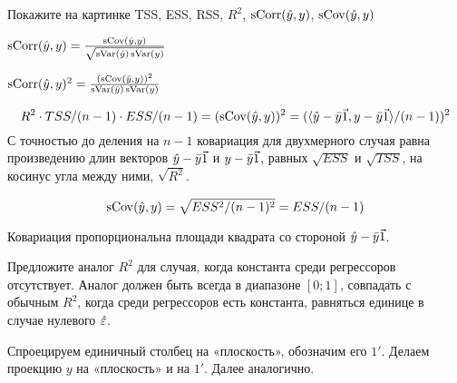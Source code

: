 \begin{problem}
Покажите на картинке TSS, ESS, RSS, $R^2$, $\operatorname{sCorr}(\hat{y}, y)$, $\operatorname{sCov}(\hat{y}, y)$





\begin{sol}
$\operatorname{sCorr}(\hat{y}, y)=\frac{\operatorname{sCov}(\hat{y}, y)}{\sqrt{\operatorname{sVar}(\hat{y})\operatorname{sVar}(y)}}$

$\operatorname{sCorr}(\hat{y}, y)^2=\frac{(\operatorname{sCov}(\hat{y}, y))^2}{\operatorname{sVar}(\hat{y})\operatorname{sVar}(y)}$

\[
R^2\cdot TSS/(n-1)\cdot ESS/(n-1)=(\sCov(\hy, y))^2=(\langle \hy-\bar y\v1, y-\bar y\v1 \rangle/(n-1))^2
\]
С точностью до деления на $n-1$ ковариация для двухмерного случая равна произведению длин векторов $\hy-\bar y\v1$ и $y-\bar y\v1$, равных $\sqrt{ESS}$ и $\sqrt{TSS}$, на косинус угла между ними, $\sqrt{R^2}$.

\[
\operatorname{sCov}(\hat{y}, y)=\sqrt{ESS^2/(n-1)^2}=ESS/(n-1)
\]

Ковариация пропорциональна площади квадрата со стороной $\hy - \bar y \v1$.
\end{sol}
\end{problem}


\begin{problem}
Предложите аналог $R^2$ для случая, когда константа среди регрессоров отсутствует. Аналог должен быть всегда в диапазоне $[0;1]$, совпадать с обычным $R^2$, когда среди регрессоров есть константа, равняться единице в случае нулевого $\hat{\varepsilon}$.


\begin{sol}
Спроецируем единичный столбец на «плоскость», обозначим его $1'$. Делаем проекцию $y$ на «плоскость» и на $1'$. Далее аналогично.
\end{sol}
\end{problem}



